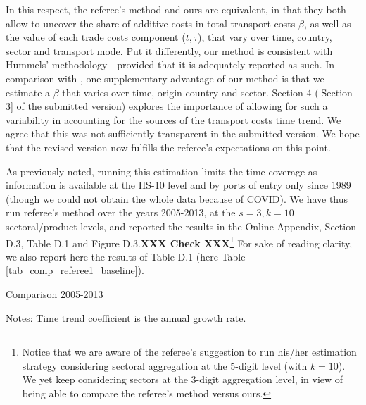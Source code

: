 \documentclass[a4paper,11pt]{article}
\begin{document}
\begin{itemize}
In this respect, the referee's method and ours are equivalent, in that they both allow to uncover the share of additive costs in total transport costs $\beta$, as well as the value of each trade costs component ($t,\tau$), that vary over time, country, sector and transport mode. Put it differently, our method is consistent with Hummels' methodology - provided that it is adequately reported as such. In comparison with \cite{hummels2007}, one supplementary advantage of our method is that we estimate a $\beta$ that varies over time, origin country and sector. Section 4 ([Section 3] of the submitted version) explores the importance of allowing for such a variability in accounting for the sources of the transport costs time trend. We agree that this was not sufficiently transparent in the submitted version. We hope that the revised version now fulfills the referee's expectations on this point.

\end{itemize}

As previously noted, running this estimation limits the time coverage as information is available at the HS-10 level and by ports of entry only since 1989 (though we could not obtain the whole data because of  COVID). We have thus run referee's method over the years 2005-2013, at the $s=3, k=10$ sectoral/product levels, and reported the results in the Online Appendix, Section D.3, Table D.1 and Figure D.3.\textbf{XXX Check XXX}\footnote{Notice that we are aware of the referee's suggestion to run his/her estimation strategy considering sectoral aggregation at the 5-digit level (with $k=10$). We yet keep considering sectors at the 3-digit aggregation level, in view of being able to compare the referee's method versus ours.} For sake of reading clarity, we also report here the results of Table D.1 (here Table \ref{tab_comp_referee1_baseline}).

\begin{table}[htbp]
	\caption{Comparison 2005-2013}
	\begin{center}		
		
	
{\parbox[l]{12cm}{ \vspace{4pt}\footnotesize{Notes: Time trend coefficient is the annual growth rate.}}}
\end{center}
	\label{tab_comp_referee1_baseline}%
\end{table}%
\end{document}
